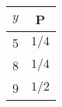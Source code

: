 \begin{tabular}{|c|c|}
\hline
 $y$ & P     \\ \hline
5 & $1/4$ \\ \hline
8 & $1/4$ \\ \hline
9 & $1/2$ \\ \hline
\end{tabular}
